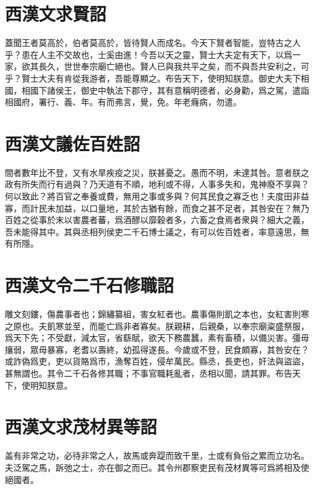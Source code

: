 \section[高帝求賢詔\quad{\small 西漢文}]{{\normalsize 西漢文}\quad {}求賢詔}
蓋聞王者莫高於，伯者莫高於，皆待賢人而成名。今天下賢者智能，豈特古之人乎？患在人主不交故也，士奚由進！今吾以天之靈，賢士大夫定有天下，以爲一家，欲其長久，世世奉宗廟亡絕也。賢人已與我共平之矣，而不與吾共安利之，可乎？賢士大夫有肯從我游者，吾能尊顯之。布告天下，使明知朕意。御史大夫下相國，相國下諸侯王，御史中執法下郡守，其有意稱明德者，必身勸，爲之駕，遣詣相國府，署行、義、年。有而弗言，覺，免。年老癃病，勿遣。 

\section[文帝議佐百姓詔\quad{\small 西漢文}]{{\normalsize 西漢文}\quad {}議佐百姓詔}
間者數年比不登，又有水旱疾疫之災，朕甚憂之。愚而不明，未達其咎。意者朕之政有所失而行有過與？乃天道有不順，地利或不得，人事多失和，鬼神廢不享與？何以致此？將百官之奉養或費，無用之事或多與？何其民食之寡乏也！夫度田非益寡，而計民未加益，以口量地，其於古猶有餘，而食之甚不足者，其咎安在？無乃百姓之從事於末以害農者蕃，爲酒醪以靡穀者多，六畜之食焉者衆與？細大之義，吾未能得其中。其與丞相列侯吏二千石博士議之，有可以佐百姓者，率意遠思，無有所隱。

\section[景帝令二千石修職詔\quad{\small 西漢文}]{{\normalsize 西漢文}\quad {}令二千石修職詔}
雕文刻鏤，傷農事者也；錦繡纂組，害女紅者也。農事傷則飢之本也，女紅害則寒之原也。夫飢寒並至，而能亡爲非者寡矣。朕親耕，后親桑，以奉宗廟粢盛祭服，爲天下先；不受獻，減太官，省繇賦，欲天下務農蠶，素有畜積，以備災害。彊毋攘弱，眾毋暴寡，老耆以壽終，幼孤得遂長。今歲或不登，民食頗寡，其咎安在？或詐偽爲吏，吏以貨賂爲市，漁奪百姓，侵牟萬民。縣丞，長吏也，奸法與盜盜，甚無謂也。其令二千石各修其職；不事官職耗亂者，丞相以聞，請其罪。布告天下，使明知朕意。

\theendnotes

\section[武帝求茂材異等詔\quad{\small 西漢文}]{{\normalsize 西漢文}\quad {}求茂材異等詔}
盖有非常之功，必待非常之人，故馬或奔踶而致千里，士或有負俗之累而立功名。夫泛駕之馬，跅弛之士，亦在御之而已。其令州郡察吏民有茂材異等可爲將相及使絕國者。 


